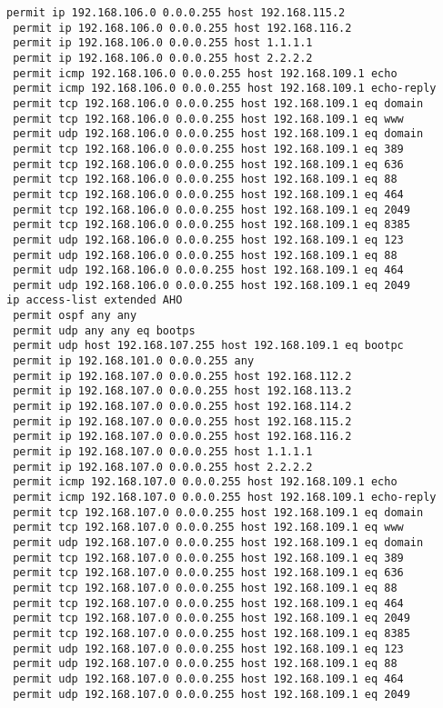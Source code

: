 \documentclass[14pt, a4paper]{extarticle}
\begin{document}
\begin{appendices}
\begin{lstlisting}[caption=Конфигурация устройства SW\_2\_L3\_IVANOV\label{list:conf_sw2_l3}]
 permit ip 192.168.106.0 0.0.0.255 host 192.168.115.2
 permit ip 192.168.106.0 0.0.0.255 host 192.168.116.2
 permit ip 192.168.106.0 0.0.0.255 host 1.1.1.1
 permit ip 192.168.106.0 0.0.0.255 host 2.2.2.2
 permit icmp 192.168.106.0 0.0.0.255 host 192.168.109.1 echo
 permit icmp 192.168.106.0 0.0.0.255 host 192.168.109.1 echo-reply
 permit tcp 192.168.106.0 0.0.0.255 host 192.168.109.1 eq domain
 permit tcp 192.168.106.0 0.0.0.255 host 192.168.109.1 eq www
 permit udp 192.168.106.0 0.0.0.255 host 192.168.109.1 eq domain
 permit tcp 192.168.106.0 0.0.0.255 host 192.168.109.1 eq 389
 permit tcp 192.168.106.0 0.0.0.255 host 192.168.109.1 eq 636
 permit tcp 192.168.106.0 0.0.0.255 host 192.168.109.1 eq 88
 permit tcp 192.168.106.0 0.0.0.255 host 192.168.109.1 eq 464
 permit tcp 192.168.106.0 0.0.0.255 host 192.168.109.1 eq 2049
 permit tcp 192.168.106.0 0.0.0.255 host 192.168.109.1 eq 8385
 permit udp 192.168.106.0 0.0.0.255 host 192.168.109.1 eq 123
 permit udp 192.168.106.0 0.0.0.255 host 192.168.109.1 eq 88
 permit udp 192.168.106.0 0.0.0.255 host 192.168.109.1 eq 464
 permit udp 192.168.106.0 0.0.0.255 host 192.168.109.1 eq 2049
ip access-list extended AHO
 permit ospf any any
 permit udp any any eq bootps
 permit udp host 192.168.107.255 host 192.168.109.1 eq bootpc
 permit ip 192.168.101.0 0.0.0.255 any
 permit ip 192.168.107.0 0.0.0.255 host 192.168.112.2
 permit ip 192.168.107.0 0.0.0.255 host 192.168.113.2
 permit ip 192.168.107.0 0.0.0.255 host 192.168.114.2
 permit ip 192.168.107.0 0.0.0.255 host 192.168.115.2
 permit ip 192.168.107.0 0.0.0.255 host 192.168.116.2
 permit ip 192.168.107.0 0.0.0.255 host 1.1.1.1
 permit ip 192.168.107.0 0.0.0.255 host 2.2.2.2
 permit icmp 192.168.107.0 0.0.0.255 host 192.168.109.1 echo
 permit icmp 192.168.107.0 0.0.0.255 host 192.168.109.1 echo-reply
 permit tcp 192.168.107.0 0.0.0.255 host 192.168.109.1 eq domain
 permit tcp 192.168.107.0 0.0.0.255 host 192.168.109.1 eq www
 permit udp 192.168.107.0 0.0.0.255 host 192.168.109.1 eq domain
 permit tcp 192.168.107.0 0.0.0.255 host 192.168.109.1 eq 389
 permit tcp 192.168.107.0 0.0.0.255 host 192.168.109.1 eq 636
 permit tcp 192.168.107.0 0.0.0.255 host 192.168.109.1 eq 88
 permit tcp 192.168.107.0 0.0.0.255 host 192.168.109.1 eq 464
 permit tcp 192.168.107.0 0.0.0.255 host 192.168.109.1 eq 2049
 permit tcp 192.168.107.0 0.0.0.255 host 192.168.109.1 eq 8385
 permit udp 192.168.107.0 0.0.0.255 host 192.168.109.1 eq 123
 permit udp 192.168.107.0 0.0.0.255 host 192.168.109.1 eq 88
 permit udp 192.168.107.0 0.0.0.255 host 192.168.109.1 eq 464
 permit udp 192.168.107.0 0.0.0.255 host 192.168.109.1 eq 2049

\end{lstlisting}
\end{appendices}
\end{document}
